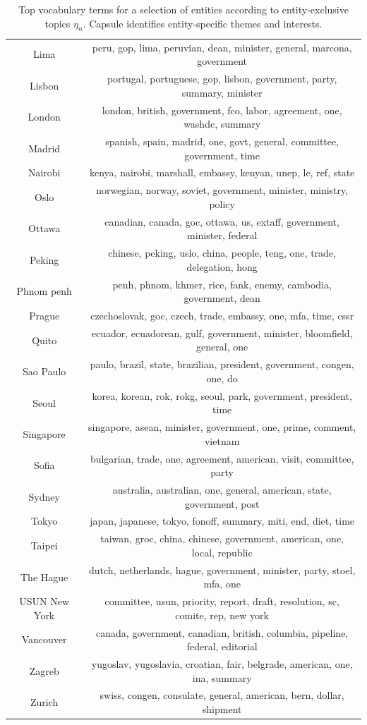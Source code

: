 \begin{table}
\begin{tabular}{cc}
Lima & peru, gop, lima, peruvian, dean, minister, general, marcona, government \\
Lisbon & portugal, portuguese, gop, lisbon, government, party, summary, minister \\
London & london, british, government, fco, labor, agreement, one, washdc, summary \\
Madrid & spanish, spain, madrid, one, govt, general, committee, government, time \\
Nairobi & kenya, nairobi, marshall, embassy, kenyan, unep, le, ref, state \\
Oslo & norwegian, norway, soviet, government, minister, ministry, policy \\
Ottawa & canadian, canada, goc, ottawa, us, extaff, government, minister, federal \\
Peking & chinese, peking, uslo, china, people, teng, one, trade, delegation, hong \\
Phnom penh & penh, phnom, khmer, rice, fank, enemy, cambodia, government, dean \\
Prague & czechoslovak, goc, czech, trade, embassy, one, mfa, time, cssr \\
Quito & ecuador, ecuadorean, gulf, government, minister, bloomfield, general, one \\
Sao Paulo & paulo, brazil, state, brazilian, president, government, congen, one, do \\
Seoul & korea, korean, rok, rokg, seoul, park, government, president, time \\
Singapore & singapore, asean, minister, government, one, prime, comment, vietnam \\
Sofia & bulgarian, trade, one, agreement, american, visit, committee, party \\
Sydney & australia, australian, one, general, american, state, government, post \\
Tokyo & japan, japanese, tokyo, fonoff, summary, miti, end, diet, time \\
Taipei & taiwan, groc, china, chinese, government, american, one, local, republic \\
The Hague & dutch, netherlands, hague, government, minister, party, stoel, mfa, one \\
USUN New York & committee, usun, priority, report, draft, resolution, sc, comite, rep, new york \\
Vancouver & canada, government, canadian, british, columbia, pipeline, federal, editorial \\
Zagreb & yugoslav, yugoslavia, croatian, fair, belgrade, american, one, ina, summary \\
Zurich & swiss, congen, consulate, general, american, bern, dollar, shipment \\
\bottomrule
\end{tabular}
\caption{Top vocabulary terms for a selection of entities according to entity-exclusive topics $\eta_n$.  Capsule identifies entity-specific themes and interests.}
\label{tab:entities}
\end{table}


